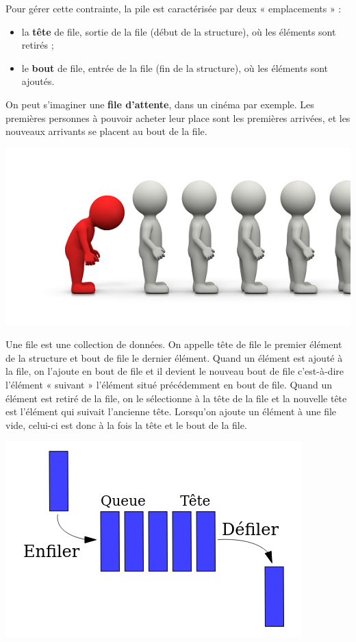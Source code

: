 \documentclass[
  letterpaper,
  DIV=11,
  numbers=noendperiod]{scrartcl}
\providecommand{\tightlist}{%
  \setlength{\itemsep}{0pt}\setlength{\parskip}{0pt}}\usepackage{longtable,booktabs,array}
\begin{document}
Pour gérer cette contrainte, la pile est caractérisée par deux «
emplacements » :

\begin{itemize}
\tightlist
\item
  la \textbf{tête} de file, sortie de la file (début de la structure),
  où les éléments sont retirés ;
\item
  le \textbf{bout} de file, entrée de la file (fin de la structure), où
  les éléments sont ajoutés.
\end{itemize}

On peut s'imaginer une \textbf{file d'attente}, dans un cinéma par
exemple. Les premières personnes à pouvoir acheter leur place sont les
premières arrivées, et les nouveaux arrivants se placent au bout de la
file.

\includegraphics{file.jpg}

Une file est une collection de données. On appelle tête de file le
premier élément de la structure et bout de file le dernier élément.
Quand un élément est ajouté à la file, on l'ajoute en bout de file et il
devient le nouveau bout de file c'est-à-dire l'élément « suivant »
l'élément situé précédemment en bout de file. Quand un élément est
retiré de la file, on le sélectionne à la tête de la file et la nouvelle
tête est l'élément qui suivait l'ancienne tête. Lorsqu'on ajoute un
élément à une file vide, celui-ci est donc à la fois la tête et le bout
de la file.

\includegraphics{FIFO_queue.png}
\end{document}

